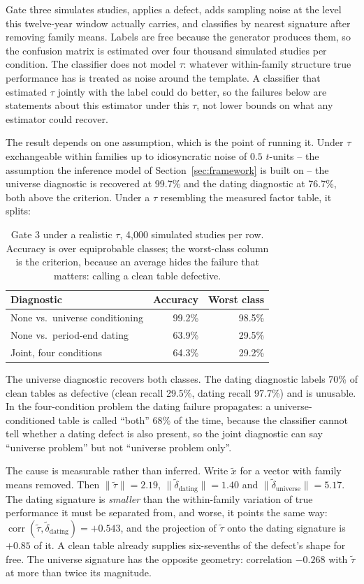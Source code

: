 \documentclass[11pt]{article}
\begin{document}
Gate three simulates studies, applies a defect, adds sampling noise at the level
this twelve-year window actually carries, and classifies by nearest signature after
removing family means. Labels are free because the generator produces them, so the
confusion matrix is estimated over four thousand simulated studies per condition. The
classifier does not model $\tau$: whatever within-family structure true performance has
is treated as noise around the template. A classifier that estimated $\tau$ jointly with
the label could do better, so the failures below are statements about this estimator
under this $\tau$, not lower bounds on what any estimator could recover.

The result depends on one assumption, which is the point of running it. Under $\tau$
exchangeable within families up to idiosyncratic noise of $0.5$ $t$-units -- the
assumption the inference model of Section~\ref{sec:framework} is built on -- the universe
diagnostic is recovered at 99.7\% and the dating diagnostic at 76.7\%, both above the
criterion. Under a $\tau$ resembling the measured factor table, it splits:

\begin{table}[h]
\centering
\small
\begin{tabular}{lrr}
\toprule
Diagnostic & Accuracy & Worst class \\
\midrule
None vs.\ universe conditioning & 99.2\% & 98.5\% \\
None vs.\ period-end dating & 63.9\% & 29.5\% \\
Joint, four conditions & 64.3\% & 29.2\% \\
\bottomrule
\end{tabular}
\caption{Gate 3 under a realistic $\tau$, 4,000 simulated studies per row. Accuracy is
over equiprobable classes; the worst-class column is the criterion, because an average
hides the failure that matters: calling a clean table defective.}
\label{tab:gate3}
\end{table}

The universe diagnostic recovers both classes. The dating diagnostic labels 70\% of
clean tables as defective (clean recall 29.5\%, dating recall 97.7\%) and is unusable.
In the four-condition problem the dating failure propagates: a universe-conditioned table
is called ``both'' 68\% of the time, because the classifier cannot tell whether a dating
defect is also present, so the joint diagnostic can say ``universe problem'' but not
``universe problem only''.

The cause is measurable rather than inferred. Write $\tilde{x}$ for a vector with
family means removed. Then $\lVert\tilde{\tau}\rVert = 2.19$,
$\lVert\tilde{\delta}_\text{dating}\rVert = 1.40$ and
$\lVert\tilde{\delta}_\text{universe}\rVert = 5.17$. The dating signature is
\emph{smaller} than the within-family variation of true performance it must be
separated from, and worse, it points the same way:
$\operatorname{corr}(\tilde{\tau}, \tilde{\delta}_\text{dating}) = +0.543$, and the
projection of $\tilde{\tau}$ onto the dating signature is $+0.85$ of it. A clean
table already supplies six-sevenths of the defect's shape for free. The universe
signature has the opposite geometry: correlation $-0.268$ with $\tilde{\tau}$ at
more than twice its magnitude.
\end{document}
